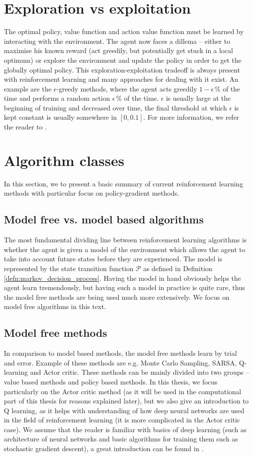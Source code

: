 \section{Exploration vs exploitation}
The optimal policy, value function and action value function must be learned by interacting with the environment. The agent now faces a dillema -- either to maximise his known reward (act greedily, but potentially get stuck in a local optimum) or explore the environment and update the policy in order to get the globally optimal policy. This exploration-exploitation tradeoff is always present with reinforcement learning and many approaches for dealing with it exist. An example are the $\epsilon$-greedy methods, where the agent acts greedily $1-\epsilon \, \%$ of the time and performs a random action $\epsilon \, \%$ of the time. $\epsilon$ is usually large at the beginning of training and decreased over time, the final threshold at which $\epsilon$ is kept constant is usually somewhere in $[0,0.1]$. For more information, we refer the reader to \cite[Section 2.7.]{sutton2018reinforcement}.

\section{Algorithm classes}
In this section, we to present a basic summary of current reinforcement learning methods with particular focus on policy-gradient methods.
\subsection{Model free vs. model based algorithms}
The most fundamental dividing line between reinforcement learning algorithms is whether the agent is given a model of the environment which allows the agent to take into account future states before they are experienced. The model is represented by the state transition function $\mathcal{P}$ as defined in Definition \ref{defn:markov_decision_process}. Having the model in hand obviously helps the agent learn tremendously, but having such a model in practice is quite rare, thus the model free methods are being used much more extensively. We focus on model free algorithms in this text.

\subsection{Model free methods}
In comparison to model based methods, the model free methods learn by trial and error.
Example of these methods are e.g. Monte Carlo Sampling, SARSA, Q-learning and Actor critic. These methods can be mainly divided into two groups -- value based methods and policy based methods. In this thesis, we focus particularly on the Actor critic method (as it will be used in the computational part of this thesis for reasons explained later), but we also give an introduction to Q learning, as it helps with understanding of how deep neural networks are used in the field of reinforcement learning (it is more complicated in the Actor critic case). We assume that the reader is familiar with basics of deep learning (such as architecture of neural networks and basic algorithms for training them such as stochastic gradient descent), a great introduction can be found in \cite[Part 2]{deep_learning_book}.
